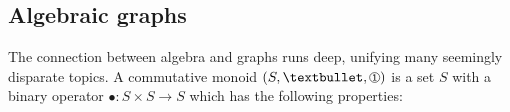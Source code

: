 \documentclass[11pt]{article}
\newcommand*\circled[1]{\tikz[baseline=-0.1cm]{
    \node[shape=circle,draw,inner sep=0.48pt] (char) {\fontsize{7}{12}\textsf{#1}};}}
\begin{document}
%
%

    \subsection{Algebraic graphs}\label{subsec:algebraic-graphs}

    The connection between algebra and graphs runs deep, unifying many seemingly disparate topics. A commutative monoid $(S, •, \circled{1})$ is a set $S$ with a binary operator $•: S \times S → S$ which has the following properties:

\end{document}
